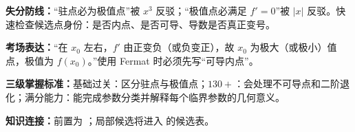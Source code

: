 \begin{knowledgeBox}
\textbf{失分防线：}“驻点必为极值点”被 \(x^3\) 反驳；“极值点必满足 \(f'=0\)”被 \(|x|\) 反驳。快速检查候选点身份：是否内点、是否可导、导数是否真正变号。

\textbf{考场表达：}“在 \(x_0\) 左右，\(f'\) 由正变负（或负变正），故 \(x_0\) 为极大（或极小）值点，极值为 \(f(x_0)\)。”使用 Fermat 时必须先写“可导内点”。

\textbf{三级掌握标准：}基础过关：区分驻点与极值点；\(130+\)：会处理不可导点和二阶退化；满分能力：能完成参数分类并解释每个临界参数的几何意义。

\textbf{知识连接：}前置为 ；局部候选将进入 的候选表。
\end{knowledgeBox}


\par


